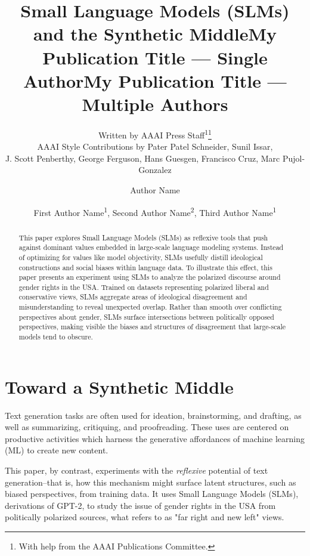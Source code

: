 \documentclass[letterpaper]{article} %
\title{Small Language Models (SLMs) and the Synthetic Middle}
\author{
    Written by AAAI Press Staff\textsuperscript{\rm 1}\thanks{With help from the AAAI Publications Committee.}\\
    AAAI Style Contributions by Pater Patel Schneider,
    Sunil Issar,\\
    J. Scott Penberthy,
    George Ferguson,
    Hans Guesgen,
    Francisco Cruz\equalcontrib,
    Marc Pujol-Gonzalez\equalcontrib
}
\title{My Publication Title --- Single Author}
\author {
    Author Name
}
\title{My Publication Title --- Multiple Authors}
\author {
    First Author Name\textsuperscript{\rm 1},
    Second Author Name\textsuperscript{\rm 2},
    Third Author Name\textsuperscript{\rm 1}
}
\begin{document}
\maketitle

\begin{abstract}
This paper explores Small Language Models (SLMs) as reflexive tools that push against dominant values embedded in large-scale language modeling systems. Instead of optimizing for values like model objectivity, SLMs usefully distill ideological constructions and social biases within language data. To illustrate this effect, this paper presents an experiment using SLMs to analyze the polarized discourse around gender rights in the USA. Trained on datasets representing polarized liberal and conservative views, SLMs aggregate areas of ideological disagreement and misunderstanding to reveal unexpected overlap. Rather than smooth over conflicting perspectives about gender, SLMs surface intersections between politically opposed perspectives, making visible the biases and structures of disagreement that large-scale models tend to obscure.
\end{abstract}

\section{Toward a Synthetic Middle}

Text generation tasks are often used for ideation, brainstorming, and drafting, as well as summarizing, critiquing, and proofreading. These uses are centered on productive activities which harness the generative affordances of machine learning (ML) to create new content. 

This paper, by contrast, experiments with the \textit{reflexive} potential of text generation--that is, how this mechanism might surface latent structures, such as biased perspectives, from training data. It uses Small Language Models (SLMs), derivations of GPT-2, to study the issue of gender rights in the USA from politically polarized sources, what \citet{bornschier_2021} refers to as "far right and new left" views. 
\end{document}
